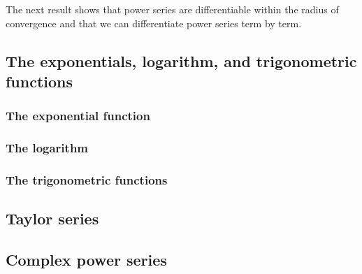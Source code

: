 \documentclass[10pt, a4paper]{article}
\begin{document}
The next result shows that power series are differentiable within the radius of convergence and that we can differentiate power series term by term.


















































\subsection{The exponentials, logarithm, and trigonometric functions}

\subsubsection{The exponential function}

\subsubsection{The logarithm}

\subsubsection{The trigonometric functions}

\subsection{Taylor series}

\subsection{Complex power series}
\end{document}
